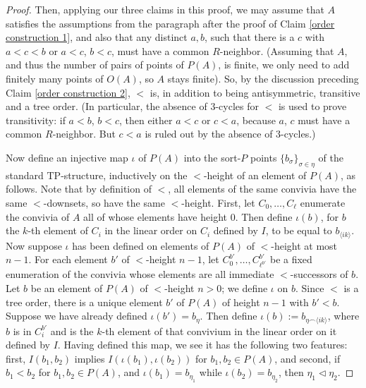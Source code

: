 \documentclass{amsart}
\theoremstyle{definition}
\theoremstyle{remark}
\numberwithin{equation}{section}
\begin{document}
\begin{proof}
Then, applying our three claims in this proof, we may assume that $A$ satisfies the assumptions from the paragraph after the proof of Claim \ref{order construction 1}, and also that any distinct $a, b$, such that there is a $c$ with $a < c < b$ or $a < c$, $b < c$, must have a common $R$-neighbor. (Assuming that $A$, and thus the number of pairs of points of $P(A)$, is finite, we only need to add finitely many points of $O(A)$, so $A$ stays finite). So, by the discussion preceding Claim \ref{order construction 2}, $<$ is, in addition to being antisymmetric, transitive and a tree order. (In particular, the absence of $3$-cycles for $<$ is used to prove transitivity: if $a< b$, $b< c$, then either $a < c$ or $c < a$, because $a$, $c$ must have a common $R$-neighbor. But $c <a$ is ruled out by the absence of $3$-cycles.)


Now define an injective map $\iota$ of $P(A)$ into the sort-$P$ points $\{b_{\sigma}\}_{\sigma \in \eta}$ of the standard $\mathrm{TP}$-structure, inductively on the $<$-height of an element of $P(A)$, as follows. Note that by definition of $<$, all elements of the same convivia have the same $<$-downsets, so have the same $<$-height. First, let $C_0, \ldots, C_\ell$ enumerate the convivia of $A$ all of whose elements have height $0$.  Then define $\iota(b)$, for $b$ the $k$-th element of $C_{i}$ in the linear order on $C_i$ defined by $I$, to be equal to $b_{\langle ik \rangle}$. Now suppose $\iota$ has been defined on elements of $P(A)$ of $<$-height at most $n-1$. For each element $b'$ of $<$-height $n -1$, let $C^{b'}_{0}, \ldots, C^{b'}_{\ell^{b'}}$ be a fixed enumeration of the convivia whose elements are all immediate $<$-successors of $b$. Let $b$ be an element of $P(A)$ of $<$-height $n > 0$; we define $\iota$ on $b$. Since $<$ is a tree order, there is a unique element $b'$ of $P(A)$ of height $n-1$ with $b' < b$.  Suppose we have already defined $\iota(b') = b_{\eta}$. Then define $\iota(b) := b_{\eta \smallfrown \langle ik \rangle}$, where $b$ is in $C^{b'}_i$ and is the $k$-th element of that convivium in the linear order on it defined by $I$. Having defined this map, we see it has the following two features: first, $I(b_1, b_2)$ implies $I(\iota(b_1), \iota(b_2))$ for $b_1, b_2 \in P(A)$, and second, if $b_1 < b_2$ for $b_1, b_2 \in P(A)$, and $\iota(b_1)=b_{\eta_1}$ while $\iota(b_2) = b_{\eta_2}$, then $\eta_{1} \lhd \eta_2$.



\end{proof}
\end{document}
